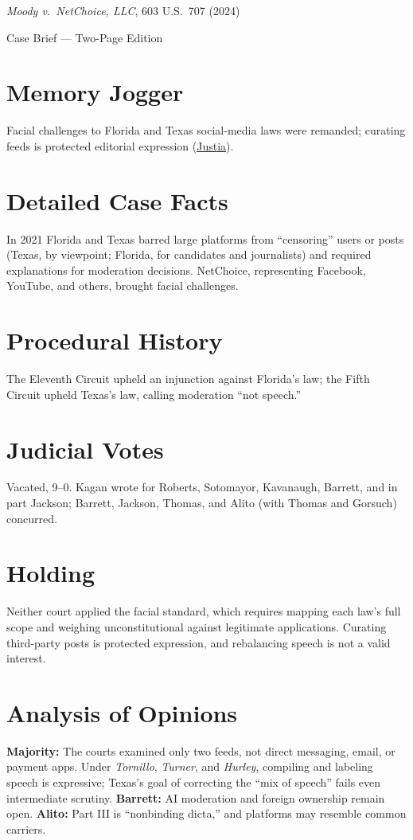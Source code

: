 \documentclass[12pt]{article}
\begin{document}
\begin{center}
{\LARGE \textit{Moody v.\ NetChoice, LLC}, 603 U.S.\ 707 (2024)\par}
\vspace{0.5em}
{\large Case Brief --- Two-Page Edition\par}
\end{center}

\section{Memory Jogger}
Facial challenges to Florida and Texas social-media laws were remanded; curating feeds is protected editorial expression (\href{https://supreme.justia.com/cases/federal/us/603/22-277/}{Justia}).

\section{Detailed Case Facts}
In 2021 Florida and Texas barred large platforms from ``censoring'' users or posts (Texas, by viewpoint; Florida, for candidates and journalists) and required explanations for moderation decisions. NetChoice, representing Facebook, YouTube, and others, brought facial challenges.

\section{Procedural History}
The Eleventh Circuit upheld an injunction against Florida's law; the Fifth Circuit upheld Texas's law, calling moderation ``not speech.''

\section{Judicial Votes}
Vacated, 9--0. Kagan wrote for Roberts, Sotomayor, Kavanaugh, Barrett, and in part Jackson; Barrett, Jackson, Thomas, and Alito (with Thomas and Gorsuch) concurred.

\section{Holding}
Neither court applied the facial standard, which requires mapping each law's full scope and weighing unconstitutional against legitimate applications. Curating third-party posts is protected expression, and rebalancing speech is not a valid interest.

\section{Analysis of Opinions}
\textbf{Majority:} The courts examined only two feeds, not direct messaging, email, or payment apps. Under \textit{Tornillo}, \textit{Turner}, and \textit{Hurley}, compiling and labeling speech is expressive; Texas's goal of correcting the ``mix of speech'' fails even intermediate scrutiny. \textbf{Barrett:} AI moderation and foreign ownership remain open. \textbf{Alito:} Part III is ``nonbinding dicta,'' and platforms may resemble common carriers.
\end{document}
